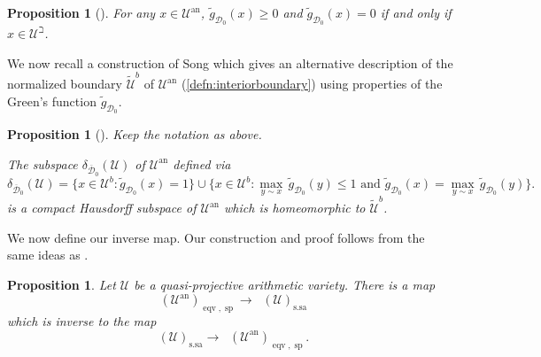 \documentclass[11pt,reqno]{amsart}
\newcommand{\cD}{\mathcal{D}}
\newcommand{\cU}{\mathcal{U}}
\newcommand{\wt}[1]{\widetilde{#1}}
\theoremstyle{theorem}
\numberwithin{equation}{subsection}
\newtheorem{prop}[subsubsection]{Proposition}
\numberwithin{equation}{subsection}
\theoremstyle{definition}
\theoremstyle{remark}
\numberwithin{equation}{subsubsection} \numberwithin{figure}{section}
\DeclareMathOperator{\an}{an}
\DeclareMathOperator{\aCaCl}{\widehat{CaCl}}
\renewcommand{\leq}{\leqslant}
\renewcommand{\geq}{\geqslant}
\DeclareMathOperator{\semip}{sp}
\DeclareMathOperator{\eqv}{eqv}
\DeclareMathOperator{\ssa}{s.sa}
\begin{document}
\begin{prop}[]\label{prop:Greens_nonvanishing}
For any $x\in \cU^{\an}$, $\wt{g}_{\cD_0}(x)\geq 0$ and $\wt{g}_{\cD_0}(x) = 0$ if and only if $x\in \cU^{\beth}$.
\end{prop}

We now recall a construction of Song which gives an alternative description of the normalized boundary $\wt{\cU}^{b}$ of $\cU^{\an}$ (\autoref{defn:interiorboundary}) using properties of the Green's function $\wt{g}_{\cD_0}$. 

\begin{prop}[]\label{prop:alternative_normalized_boundary}
Keep the notation as above. 


The subspace $\delta_{\overline{\cD}_0}(\cU)$ of $\cU^{\an}$ defined via
\[
\delta_{\overline{\cD}_0}(\cU) = \{ x\in \cU^b : \wt{g}_{\cD_0}(x) = 1 \} \cup \{ x \in \cU^b : \max_{y \sim x}\, \wt{g}_{\cD_0}(y) \leq 1 \textrm{ and }\wt{g}_{\cD_0}(x) = \max_{y\sim x}\, \wt{g}_{\cD_0}(y)\}.
\]
is a compact Hausdorff subspace of $\cU^{\an}$ which is homeomorphic to $\wt{\cU}^b$. 
\end{prop}

We now define our inverse map. Our construction and proof follows from the same ideas as \cite{Song:EquivariantAdelic}. 

\begin{prop}\label{prop:inversemap_semipositive_ssa}
Let $\cU$ be a quasi-projective arithmetic variety. 
There is a map
\[
\aCaCl(\cU^{\an})_{\eqv,\semip} \to \aCaCl(\cU)_{\ssa}
\]
which is inverse to the map 
\[
\aCaCl(\cU)_{\ssa}  \to \aCaCl(\cU^{\an})_{\eqv,\semip}.
\]
\end{prop}
\end{document}
